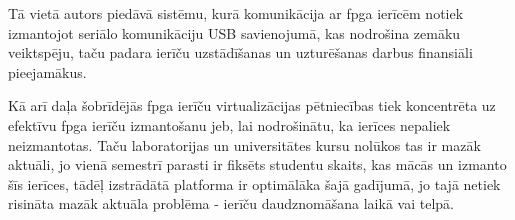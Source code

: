 Tā vietā autors piedāvā sistēmu, kurā komunikācija ar \gls{fpga} ierīcēm notiek
izmantojot seriālo komunikāciju USB savienojumā, kas nodrošina zemāku
veiktspēju, taču padara ierīču uzstādīšanas un uzturēšanas darbus finansiāli
pieejamākus. 

Kā arī daļa šobrīdējās \gls{fpga} ierīču virtualizācijas pētniecības tiek
koncentrēta uz efektīvu \gls{fpga} ierīču izmantošanu jeb, lai nodrošinātu, ka
ierīces nepaliek neizmantotas. \cite[para IV, C]{VaishnavAnuj2018} Taču
laboratorijas un universitātes kursu nolūkos tas ir mazāk aktuāli, jo vienā
semestrī parasti ir fiksēts studentu skaits, kas mācās un izmanto šīs ierīces,
tādēļ izstrādātā platforma ir optimālāka šajā gadījumā, jo tajā netiek risināta
mazāk aktuāla problēma - ierīču daudznomāšana laikā vai telpā.
